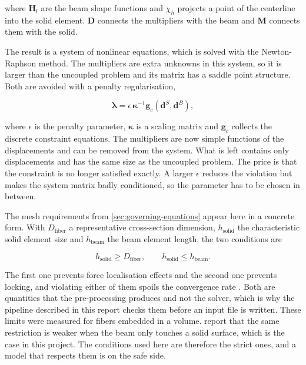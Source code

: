 where $\boldsymbol{H}_l$ are the beam shape functions and $\chi_h$ projects a point of the centerline into the solid element. $\boldsymbol{D}$ connects the multipliers with the beam and $\boldsymbol{M}$ connects them with the solid.

The result is a system of nonlinear equations, which is solved with the Newton-Raphson method. The multipliers are extra unknowns in this system, so it is larger than the uncoupled problem and its matrix has a saddle point structure. Both are avoided with a penalty regularisation,

\begin{equation}
  \boldsymbol{\lambda} = \epsilon\, \boldsymbol{\kappa}^{-1} \boldsymbol{g}_c(\boldsymbol{d}^S, \boldsymbol{d}^B) , \label{eq:penalty}
\end{equation}

where $\epsilon$ is the penalty parameter, $\boldsymbol{\kappa}$ is a scaling matrix and $\boldsymbol{g}_c$ collects the discrete constraint equations. The multipliers are now simple functions of the displacements and can be removed from the system. What is left contains only displacements and has the same size as the uncoupled problem. The price is that the constraint is no longer satisfied exactly. A larger $\epsilon$ reduces the violation but makes the system matrix badly conditioned, so the parameter has to be chosen in between.

The mesh requirements from \cref{sec:governing-equations} appear here in a concrete form. With $D_\mathrm{fiber}$ a representative cross-section dimension, $h_\mathrm{solid}$ the characteristic solid element size and $h_\mathrm{beam}$ the beam element length, the two conditions are

\begin{equation}
  h_\mathrm{solid} \geq D_\mathrm{fiber} , \qquad h_\mathrm{solid} \leq h_\mathrm{beam} . \label{eq:mesh-conditions}
\end{equation}

The first one prevents force localisation effects and the second one prevents locking, and violating either of them spoils the convergence rate \citep{steinbrecher2020}. Both are quantities that the pre-processing produces and not the solver, which is why the pipeline described in this report checks them before an input file is written. These limits were measured for fibers embedded in a volume. \citet{datz2025} report that the same restriction is weaker when the beam only touches a solid surface, which is the case in this project. The conditions used here are therefore the strict ones, and a model that respects them is on the safe side.

